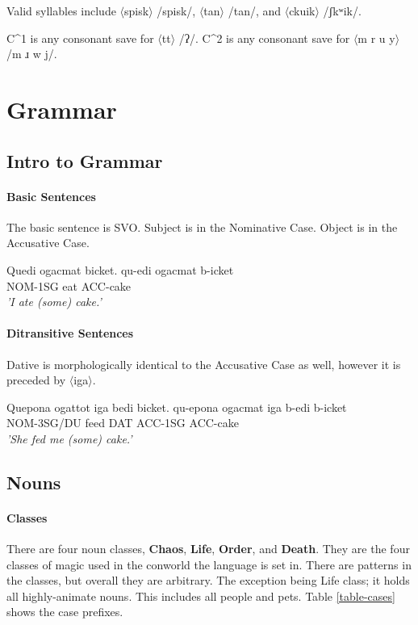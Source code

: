 \documentclass[11pt]{article}
\begin{document}
Valid syllables include 
$\langle$spisk$\rangle$ /spisk/,
$\langle$tan$\rangle$ /tan/,
and $\langle$ckuik$\rangle$ /ʃkʷik/.

C^1 is any consonant save for $\langle$tt$\rangle$ /ʔ/.
C^2 is any consonant save for $\langle$m r u y$\rangle$ /m ɹ w j/.

\section{Grammar}

\subsection{Intro to Grammar}

\paragraph{Basic Sentences}
The basic sentence is SVO.
Subject is in the Nominative Case.
Object is in the Accusative Case.

\begin{exe}
\ex \label{basicsentence}
Quedi ogacmat bicket.
\gll
qu-edi ogacmat b-icket\\
NOM-1SG   eat   ACC-cake\\
\trans 
    \textit{'I ate (some) cake.'}\\
\end{exe}

\paragraph{Ditransitive Sentences}
Dative is morphologically identical to the Accusative Case as well,
  however it is preceded by $\langle$iga$\rangle$.

\begin{exe}
\ex \label{basicsentence}
Quepona ogattot iga bedi bicket.
\gll
qu-epona  ogacmat iga b-edi b-icket\\
NOM-3SG/DU feed  DAT ACC-1SG ACC-cake\\
\trans 
    \textit{'She fed me (some) cake.'}\\
\end{exe}


\subsection{Nouns}

\paragraph{Classes}
There are four noun classes,
\textbf{Chaos}, \textbf{Life}, \textbf{Order}, and \textbf{Death}.
They are the four classes of magic used in the conworld the language is set in.
There are patterns in the classes, but overall they are arbitrary.
The exception being Life class;
it holds all highly-animate nouns.
This includes all people and pets.
Table \ref{table-cases} shows the case prefixes.
\end{document}
